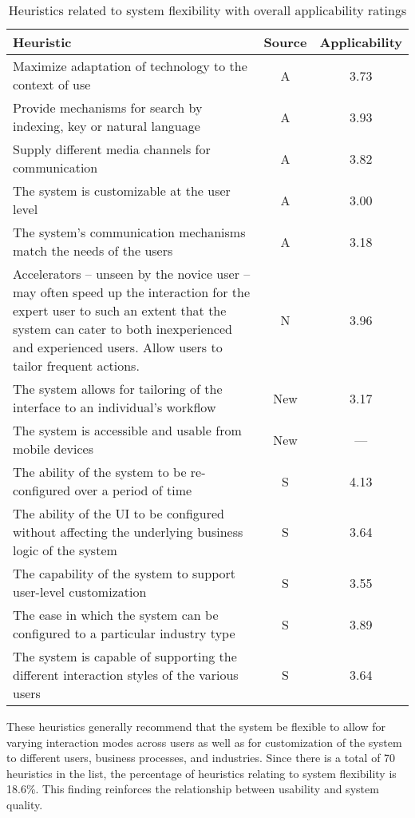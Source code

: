 \begin{table}[htb]
	\vspace{0.5cm}
	\centering
	\caption{Heuristics related to system flexibility with overall applicability ratings}
	\label{tab:flexibility_heuristics}
	\begin{tabularx}{\textwidth}{Xcc} \toprule
		\textbf{Heuristic} & \textbf{Source} & \textbf{Applicability} \\ \midrule
		Maximize adaptation of technology to the context of use & A & 3.73 \\
		Provide mechanisms for search by indexing, key or natural language & A & 3.93 \\
		Supply different media channels for communication & A & 3.82 \\
		The system is customizable at the user level & A & 3.00 \\
		The system's communication mechanisms match the needs of the users & A & 3.18 \\
		Accelerators -- unseen by the novice user -- may often speed up the interaction for the expert user to such an extent that the system can cater to both inexperienced and experienced users. Allow users to tailor frequent actions. & N & 3.96 \\
		The system allows for tailoring of the interface to an individual's workflow & New & 3.17 \\
		The system is accessible and usable from mobile devices & New & --- \\
		The ability of the system to be re-configured over a period of time & S & 4.13 \\
		The ability of the UI to be configured without affecting the underlying business logic of the system & S & 3.64 \\
		The capability of the system to support user-level customization & S & 3.55 \\
		The ease in which the system can be configured to a particular industry type & S & 3.89 \\
		The system is capable of supporting the different interaction styles of the various users & S & 3.64 \\
		\bottomrule
	\end{tabularx}
\end{table}

These heuristics generally recommend that the system be flexible to allow for varying interaction modes across users as well as for customization of the system to different users, business processes, and industries. Since there is a total of 70 heuristics in the list, the percentage of heuristics relating to system flexibility is 18.6\%. This finding reinforces the relationship between usability and system quality.

